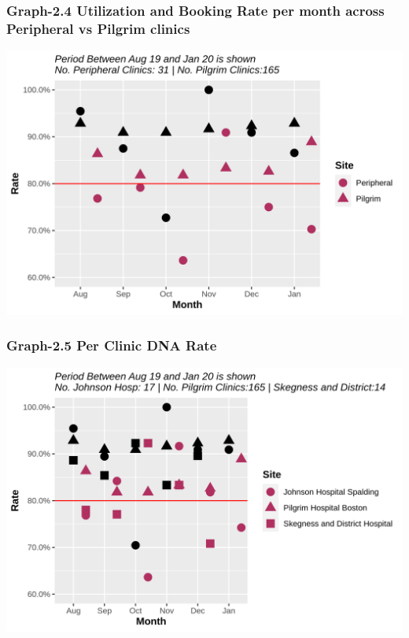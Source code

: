 \documentclass[]{article}
\begin{document}
\hypertarget{graph-2.4-utilization-and-booking-rate-per-month-across-peripheral-vs-pilgrim-clinics}{%
\subsubsection{Graph-2.4 Utilization and Booking Rate per month across
Peripheral vs Pilgrim
clinics}\label{graph-2.4-utilization-and-booking-rate-per-month-across-peripheral-vs-pilgrim-clinics}}

\begin{center}\includegraphics{LF2_files/figure-latex/unnamed-chunk-8-1} \end{center}

\hypertarget{graph-2.5-per-clinic-dna-rate}{%
\subsubsection{Graph-2.5 Per Clinic DNA
Rate}\label{graph-2.5-per-clinic-dna-rate}}

\begin{center}\includegraphics{LF2_files/figure-latex/unnamed-chunk-9-1} \end{center}
\end{document}
